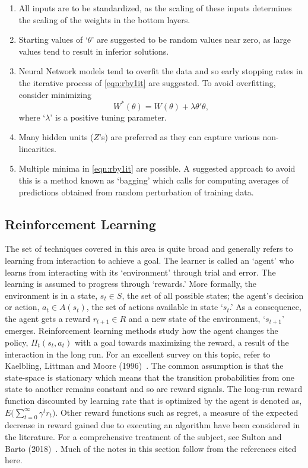 \begin{enumerate}[--]
\item All inputs are to be standardized, as the scaling of these inputs determines the scaling of the weights in the bottom layers.
\item Starting values of `$\theta$' are suggested to be random values near zero, as large values tend to result in inferior solutions.
\item Neural Network models tend to overfit the data and so early stopping rates in the iterative process of \eqref{eqn:rby1it} are suggested. To avoid overfitting, consider minimizing 
	\begin{equation}\label{eqn:overfit}
	W^*(\theta)= W(\theta) + \lambda \theta' \theta,
	\end{equation}
where `$\lambda$' is a positive tuning parameter.
\item Many hidden units ($Z$'s) are preferred as they can capture various non-linearities. 
\item Multiple minima in \eqref{eqn:rby1it} are possible. A suggested approach to avoid this is a method known as `bagging' which calls for computing averages of predictions obtained from random perturbation of training data. \\
\end{enumerate}


\subsection{Reinforcement Learning\label{sec:rein_learning}}

The set of techniques covered in this area is quite broad and generally refers to learning from interaction to achieve a goal.\label{in:re_learning} The learner is called an `agent' who learns from interacting with its `environment' through trial and error. The learning is assumed to progress through `rewards.' More formally, the environment is in a state, $s_t \in S$, the set of all possible states; the agent's decision or action, $a_t \in A(s_t)$, the set of actions available in state `$s_t$.' As a consequence, the agent gets a reward $r_{t+1} \in R$ and a new state of the environment, `$s_{t+1}$' emerges. Reinforcement learning methods study how the agent changes the policy, $\Pi_t (s_t,a_t)$ with a goal towards maximizing the reward, a result of the interaction in the long run. For an excellent survey on this topic, refer to Kaelbling, Littman and Moore (1996)~\cite{littmanmoor}. The common assumption is that the state-space is stationary which means that the transition probabilities from one state to another remains constant and so are reward signals. The long-run reward function discounted by learning rate that is optimized by the agent is denoted as, $E\big( \sum_{t=0}^\infty \gamma^t r_t \big)$. Other reward functions such as regret, a measure of the expected decrease in reward gained due to executing an algorithm have been considered in the literature. For a comprehensive treatment of the subject, see Sulton and Barto (2018)~\cite{sultonbarto}. Much of the notes in this section follow from the references cited here. \twomedskip


